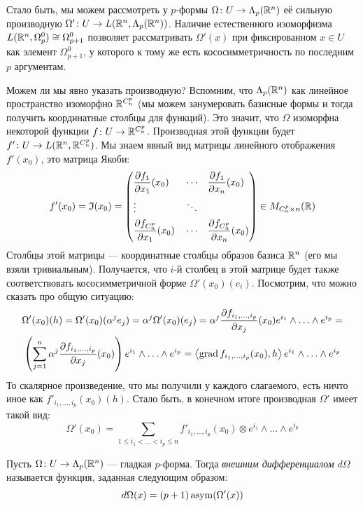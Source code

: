 \begin{note}
	Стало быть, мы можем рассмотреть у $p$-формы $\Omega \colon U \to \Lambda_p(\mathbb{R}^n)$ её сильную производную $\Omega' \colon U \to L(\mathbb{R}^n, \Lambda_p(\mathbb{R}^n))$. Наличие естественного изоморфизма $L(\mathbb{R}^n, \Omega_p^0) \cong \Omega_{p + 1}^0$ позволяет рассматривать $\Omega'(x)$ при фиксированном $x \in U$ как элемент $\Omega_{p + 1}^0$, у которого к тому же есть кососимметричность по последним $p$ аргументам.
	
	Можем ли мы явно указать производную? Вспомним, что $\Lambda_p(\mathbb{R}^n)$ как линейное пространство изоморфно $\mathbb{R}^{C_n^p}$ (мы можем занумеровать базисные формы и тогда получить координатные столбцы для функций). Это значит, что $\Omega$ изоморфна некоторой функции $f \colon U \to \mathbb{R}^{C_n^p}$. Производная этой функции будет $f' \colon U \to L(\mathbb{R}^n, \mathbb{R}^{C_n^p})$. Мы знаем явный вид матрицы линейного отображения $f'(x_0)$, это матрица Якоби:
	\[
		f'(x_0) = \mathfrak{I}(x_0) = \left( \begin{aligned} 
			&{\frac{\partial f_1}{\partial x_1}(x_0)} & &\cdots & &{\frac{\partial f_1}{\partial x_n}(x_0)}
			\\
			&\vdots & &\ddots & &
			\\
			&{\frac{\partial f_{C_n^p}}{\partial x_1}(x_0)} & &\cdots & &{\frac{\partial f_{C_n^p}}{\partial x_n}(x_0)}
		 \end{aligned} \right) \in M_{C_n^p \times n}(\mathbb{R})
	\]
	Столбцы этой матрицы --- координатные столбцы образов базиса $\mathbb{R}^n$ (его мы взяли тривиальным). Получается, что $i$-й столбец в этой матрице будет также соответствовать кососимметричной форме $\Omega'(x_0)(e_i)$. Посмотрим, что можно сказать про общую ситуацию:
	\begin{multline*}
		\Omega'(x_0)(h) = \Omega'(x_0)(\alpha^j e_j) = \alpha^j\Omega'(x_0)(e_j) = \alpha^j \frac{\partial f_{i_1, \ldots, i_p}}{\partial x_j}(x_0) e^{i_1} \wedge \ldots \wedge e^{i_p} =
		\\
		\left(\sum_{j = 1}^n \alpha^j \frac{\partial f_{i_1, \ldots, i_p}}{\partial x_j} (x_0)\right) e^{i_1} \wedge \ldots \wedge e^{i_p} = \left\langle\operatorname{grad} f_{i_1, \ldots, i_p}(x_0), h\right\rangle e^{i_1} \wedge \ldots \wedge e^{i_p}
	\end{multline*}
	То скалярное произведение, что мы получили у каждого слагаемого, есть ничто иное как $f'_{i_1, \ldots, i_p}(x_0)(h)$. Стало быть, в конечном итоге производная $\Omega'$ имеет такой вид:
	\[
		\Omega'(x_0) = \sum_{1 \le i_1 < \ldots < i_p \le n} f'_{i_1, \ldots, i_p}(x_0) \otimes e^{i_1} \wedge \ldots \wedge e^{i_p}
	\]
\end{note}

\begin{definition}
	Пусть $\Omega \colon U \to \Lambda_p(\mathbb{R}^n)$ --- гладкая $p$-форма. Тогда \textit{внешним дифференциалом} $d\Omega$ называется функция, заданная следующим образом:
	\[
		d\Omega(x) = (p + 1)\operatorname{asym}(\Omega'(x))
	\]
\end{definition}

